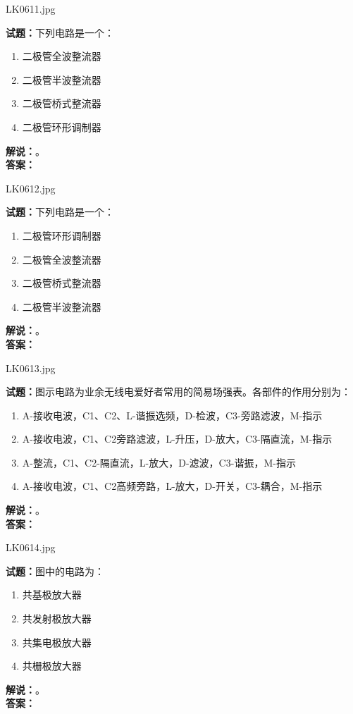 \documentclass{ctexbook}
\begin{document}
LK0611.jpg


\noindent\textbf{试题：}下列电路是一个：
\begin{enumerate}[leftmargin=3em]
\item 二极管全波整流器
\item 二极管半波整流器
\item 二极管桥式整流器
\item 二极管环形调制器
\end{enumerate}
\noindent\textbf{解说：}\textbf{}。\\\noindent\textbf{答案：}

\bigskip

LK0612.jpg


\noindent\textbf{试题：}下列电路是一个：
\begin{enumerate}[leftmargin=3em]
\item 二极管环形调制器
\item 二极管全波整流器
\item 二极管桥式整流器
\item 二极管半波整流器
\end{enumerate}
\noindent\textbf{解说：}\textbf{}。\\\noindent\textbf{答案：}

\bigskip

LK0613.jpg


\noindent\textbf{试题：}图示电路为业余无线电爱好者常用的简易场强表。各部件的作用分别为：
\begin{enumerate}[leftmargin=3em]
\item A-接收电波，C1、C2、L-谐振选频，D-检波，C3-旁路滤波，M-指示
\item A-接收电波，C1、C2旁路滤波，L-升压，D-放大，C3-隔直流，M-指示
\item A-整流，C1、C2-隔直流，L-放大，D-滤波，C3-谐振，M-指示
\item A-接收电波，C1、C2高频旁路，L-放大，D-开关，C3-耦合，M-指示
\end{enumerate}
\noindent\textbf{解说：}\textbf{}。\\\noindent\textbf{答案：}

\bigskip

LK0614.jpg


\noindent\textbf{试题：}图中的电路为：
\begin{enumerate}[leftmargin=3em]
\item 共基极放大器
\item 共发射极放大器
\item 共集电极放大器
\item 共栅极放大器
\end{enumerate}
\noindent\textbf{解说：}\textbf{}。\\\noindent\textbf{答案：}
\end{document}

